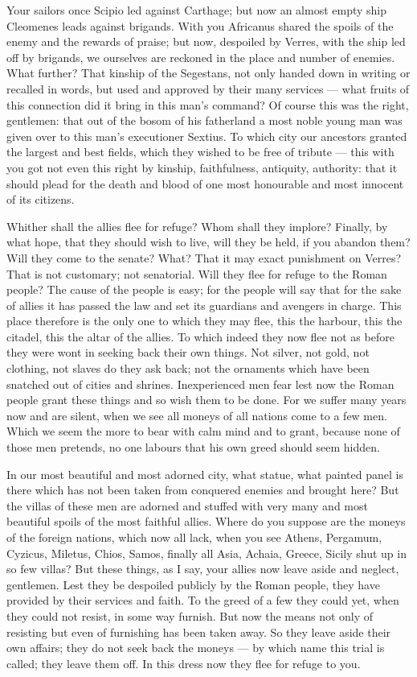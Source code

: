  Your sailors once Scipio led against Carthage; but now an almost empty ship Cleomenes leads against brigands. With you Africanus shared the spoils of the enemy and the rewards of praise; but now, despoiled by Verres, with the ship led off by brigands, we ourselves are reckoned in the place and number of enemies. What further? That kinship of the Segestans, not only handed down in writing or recalled in words, but used and approved by their many services --- what fruits of this connection did it bring in this man's command? Of course this was the right, gentlemen: that out of the bosom of his fatherland a most noble young man was given over to this man's executioner Sextius. To which city our ancestors granted the largest and best fields, which they wished to be free of tribute --- this with you got not even this right by kinship, faithfulness, antiquity, authority: that it should plead for the death and blood of one most honourable and most innocent of its citizens.

 Whither shall the allies flee for refuge? Whom shall they implore? Finally, by what hope, that they should wish to live, will they be held, if you abandon them? Will they come to the senate? What? That it may exact punishment on Verres? That is not customary; not senatorial. Will they flee for refuge to the Roman people? The cause of the people is easy; for the people will say that for the sake of allies it has passed the law and set its guardians and avengers in charge. This place therefore is the only one to which they may flee, this the harbour, this the citadel, this the altar of the allies. To which indeed they now flee not as before they were wont in seeking back their own things. Not silver, not gold, not clothing, not slaves do they ask back; not the ornaments which have been snatched out of cities and shrines. Inexperienced men fear lest now the Roman people grant these things and so wish them to be done. For we suffer many years now and are silent, when we see all moneys of all nations come to a few men. Which we seem the more to bear with calm mind and to grant, because none of those men pretends, no one labours that his own greed should seem hidden.

 In our most beautiful and most adorned city, what statue, what painted panel is there which has not been taken from conquered enemies and brought here? But the villas of these men are adorned and stuffed with very many and most beautiful spoils of the most faithful allies. Where do you suppose are the moneys of the foreign nations, which now all lack, when you see Athens, Pergamum, Cyzicus, Miletus, Chios, Samos, finally all Asia, Achaia, Greece, Sicily shut up in so few villas? But these things, as I say, your allies now leave aside and neglect, gentlemen. Lest they be despoiled publicly by the Roman people, they have provided by their services and faith. To the greed of a few they could yet, when they could not resist, in some way furnish. But now the means not only of resisting but even of furnishing has been taken away. So they leave aside their own affairs; they do not seek back the moneys --- by which name this trial is called; they leave them off. In this dress now they flee for refuge to you.

